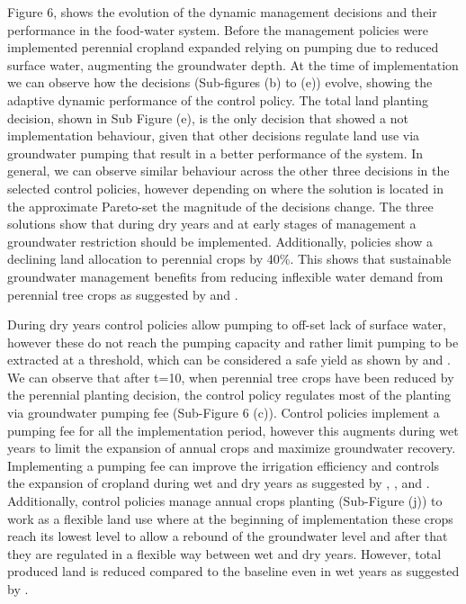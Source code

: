 \documentclass[11pt,a4paper]{article}
\begin{document}
Figure 6, shows the evolution of the dynamic management decisions and their performance in the food-water system. Before the management policies were implemented perennial cropland expanded relying on pumping due to reduced surface water, augmenting the groundwater depth. At the time of implementation we can observe how the decisions (Sub-figures (b) to (e)) evolve, showing the adaptive dynamic performance of the control policy. The total land planting decision, shown in Sub Figure (e), is the only decision that showed a not implementation behaviour, given that other decisions regulate land use via groundwater pumping that result in a better performance of the system. In general, we can observe similar behaviour across the other three decisions in the selected control policies, however depending on where the solution is located in the approximate Pareto-set the magnitude of the decisions change. The three solutions show that during dry years and at early stages of management a groundwater restriction should be implemented. Additionally, policies show a declining land allocation to perennial crops by 40\%. This shows that sustainable groundwater management benefits from reducing inflexible water demand from perennial tree crops as suggested by \textcite{qin_flexibility_2019} and \cite{mall_water_2019}. 

During dry years control policies allow pumping to off-set lack of surface water, however these do not reach the pumping capacity and rather limit pumping to be extracted at a threshold, which can be considered a safe yield as shown by \textcite{miro_framework_2019} and \cite{macewan_hydroeconomic_2017}. We can observe that after t=10, when perennial tree crops have been reduced by the perennial planting decision, the control policy regulates most of the planting via groundwater pumping fee (Sub-Figure 6 (c)). Control policies implement a pumping fee for all the implementation period, however this augments during wet years to limit the expansion of annual crops and maximize groundwater recovery. Implementing a pumping fee can improve the irrigation efficiency and controls the expansion of cropland during wet and dry years as suggested by \textcite{stone_economic_2022}, \textcite{graveline_combining_2020}, and \textcite{khan_effect_2019}. Additionally, control policies manage annual crops planting (Sub-Figure (j)) to work as a flexible land use where at the beginning of implementation these crops reach its lowest level to allow a rebound of the groundwater level and after that they are regulated in a flexible way between wet and dry years. However, total produced land is reduced compared to the baseline even in wet years as suggested by \textcite{hanak_water_2019}.
\end{document}

